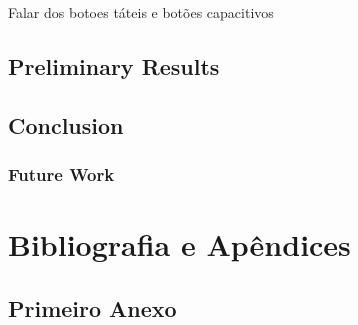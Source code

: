 \documentclass[english]{ist-thesis}
\begin{document}
Falar dos botoes táteis e botões capacitivos

\chapter{Preliminary Results}

\chapter{Conclusion}

\section{Future Work}

\part{Bibliografia e Apêndices}

\printbibliography[heading = bibintoc]

\appendix

\chapter{Primeiro Anexo}

\lipsum

\makespine
\end{document}
